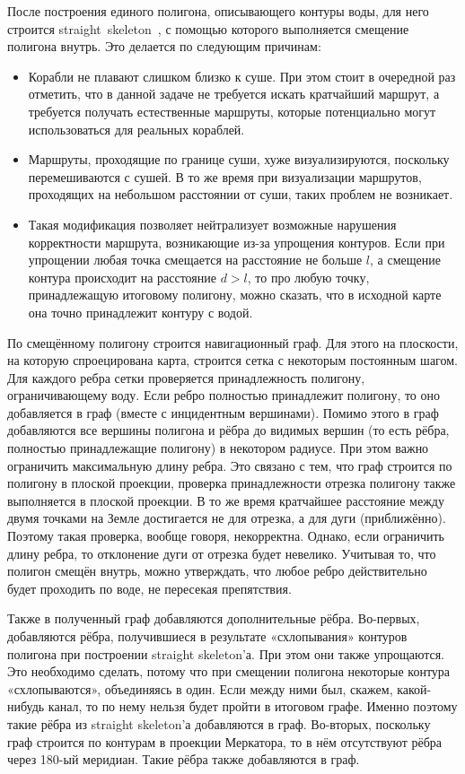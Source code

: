 После построения единого полигона, описывающего контуры воды, для него
строится straight~skeleton~\cite{aichholzer1996straight}, с помощью
которого выполняется смещение полигона внутрь. Это делается по
следующим причинам:
\begin{itemize}
    \item Корабли не плавают слишком близко к суше. При этом стоит в
      очередной раз отметить, что в данной задаче не требуется искать
      кратчайший маршрут, а требуется получать естественные маршруты,
      которые потенциально могут использоваться для реальных кораблей.
    \item Маршруты, проходящие по границе суши, хуже визуализируются,
      поскольку перемешиваются с сушей. В то же время при визуализации
      маршрутов, проходящих на небольшом расстоянии от суши, таких
      проблем не возникает.
    \item Такая модификация позволяет нейтрализует возможные нарушения
      корректности маршрута, возникающие из-за упрощения контуров.
      Если при упрощении любая точка смещается на расстояние не больше
      $l$, а смещение контура происходит на расстояние $d > l$, то про
      любую точку, принадлежащую итоговому полигону, можно сказать,
      что в исходной карте она точно принадлежит контуру с водой.
\end{itemize}

По смещённому полигону строится навигационный граф. Для этого на
плоскости, на которую спроецирована карта, строится сетка с некоторым
постоянным шагом. Для каждого ребра сетки проверяется принадлежность
полигону, ограничивающему воду. Если ребро полностью принадлежит
полигону, то оно добавляется в граф (вместе с инцидентным вершинами).
Помимо этого в граф добавляются все вершины полигона и рёбра до
видимых вершин (то есть рёбра, полностью принадлежащие полигону) в
некотором радиусе. При этом важно ограничить максимальную длину ребра.
Это связано с тем, что граф строится по полигону в плоской проекции,
проверка принадлежности отрезка полигону также выполняется в плоской
проекции. В то же время кратчайшее расстояние между двумя точками на
Земле достигается не для отрезка, а для дуги (приближённо). Поэтому
такая проверка, вообще говоря, некорректна. Однако, если ограничить
длину ребра, то отклонение дуги от отрезка будет невелико. Учитывая
то, что полигон смещён внутрь, можно утверждать, что любое ребро
действительно будет проходить по воде, не пересекая препятствия.

Также в полученный граф добавляются дополнительные рёбра. Во-первых,
добавляются рёбра, получившиеся в результате «схлопывания» контуров
полигона при построении straight skeleton'а. При этом они также
упрощаются. Это необходимо сделать, потому что при смещении полигона
некоторые контура «схлопываются», объединяясь в один. Если между ними
был, скажем, какой-нибудь канал, то по нему нельзя будет пройти в
итоговом графе. Именно поэтому такие рёбра из straight skeleton'а
добавляются в граф. Во-вторых, поскольку граф строится по контурам в
проекции Меркатора, то в нём отсутствуют рёбра через 180-ый меридиан.
Такие рёбра также добавляются в граф.

